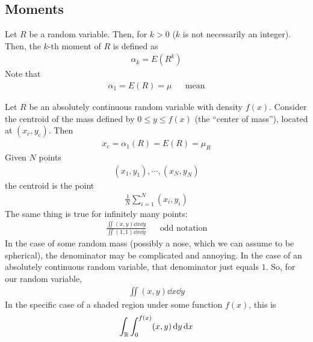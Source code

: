 \subsection{Moments}
\begin{definition}
    Let $R$ be a random variable. Then, for $k > 0$ ($k$ is not necessarily an integer). Then, the $k$-th moment of $R$ is defined as
    \begin{align}
        \alpha_k = E(R^k)
    \end{align}
    Note that
    \begin{align}
        \alpha_1 = E(R) = \mu && \text{mean}
    \end{align}
\end{definition}
Let $R$ be an absolutely continuous random variable with density $f(x)$. Consider the centroid of the mass defined by $0 \le y \le f(x)$ (the ``center of mass''), located at $(x_c, y_c)$. Then
\begin{align}
    x_c = \alpha_1(R) = E(R) = \mu_R
\end{align}
Given $N$ points
\begin{align}
    (x_1, y_1), \cdots, (x_N, y_N)
\end{align}
the centroid is the point 
\begin{align}
    \frac{1}{N} \sum_{i=1}^N (x_i, y_i)
\end{align}
The same thing is true for infinitely many points:
\begin{align}
    \frac{\iint (x,y) \dd{x}\dd{y}}{\iint (1,1) \dd{x}\dd{y}} && \text{odd notation}
\end{align}
In the case of some random mass (possibly a nose, which we can assume to be spherical), the denominator may be complicated and annoying. In the case of an absolutely continuous random variable, that denominator just equals $1$. So, for our random variable,
\begin{align}
    \iint (x,y) \dd{x}\dd{y}
\end{align}
In the specific case of a shaded region under some function $f(x)$, this is
\begin{align}
    \int_{\mathbb{R}} \int_0^{f(x)} (x,y) \dd{y}\dd{x}
\end{align}


